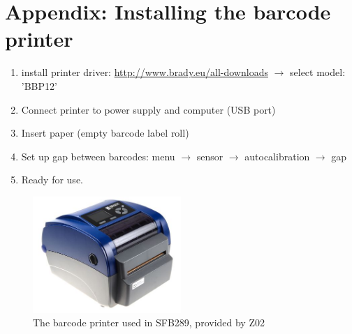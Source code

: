 \pagebreak
\section{Appendix: Installing the barcode printer}
\label{section:cheetsheet}

\large

\begin{enumerate}
    \item install printer driver: \href{http://www.brady.eu/all-downloads}{\color{pniblue}http://www.brady.eu/all-downloads} $\rightarrow$ select model: 'BBP12'
    \item Connect printer to power supply and computer (USB port)
    \item Insert paper (empty barcode label roll)
    \item Set up gap between barcodes: menu $\rightarrow$ sensor $\rightarrow$ autocalibration $\rightarrow$ gap
    \item Ready for use.
\end{enumerate}

\begin{figure}[H]
\centering
\includegraphics[width=0.5\textwidth]{docs/fig/brady.jpg}
\caption{The barcode printer used in SFB289, provided by Z02}
\label{fig:flowchart}
\end{figure}
